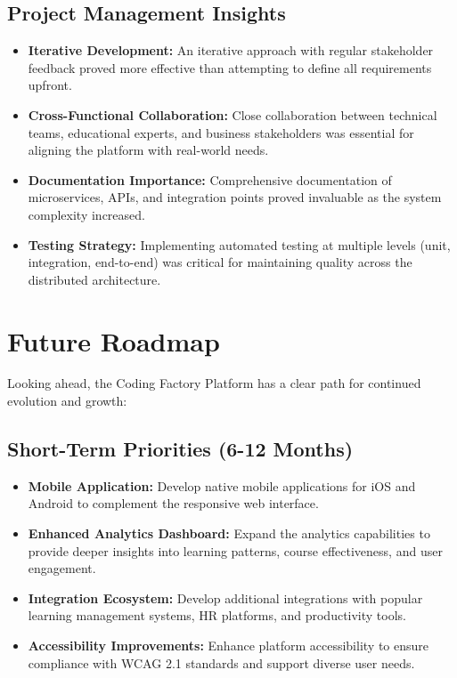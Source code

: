 \documentclass[12pt,a4paper]{report}
\begin{document}
\subsection{Project Management Insights}

\begin{itemize}
    \item \textbf{Iterative Development:} An iterative approach with regular stakeholder feedback proved more effective than attempting to define all requirements upfront.

    \item \textbf{Cross-Functional Collaboration:} Close collaboration between technical teams, educational experts, and business stakeholders was essential for aligning the platform with real-world needs.

    \item \textbf{Documentation Importance:} Comprehensive documentation of microservices, APIs, and integration points proved invaluable as the system complexity increased.

    \item \textbf{Testing Strategy:} Implementing automated testing at multiple levels (unit, integration, end-to-end) was critical for maintaining quality across the distributed architecture.
\end{itemize}

\section{Future Roadmap}

Looking ahead, the Coding Factory Platform has a clear path for continued evolution and growth:

\subsection{Short-Term Priorities (6-12 Months)}

\begin{itemize}
    \item \textbf{Mobile Application:} Develop native mobile applications for iOS and Android to complement the responsive web interface.

    \item \textbf{Enhanced Analytics Dashboard:} Expand the analytics capabilities to provide deeper insights into learning patterns, course effectiveness, and user engagement.

    \item \textbf{Integration Ecosystem:} Develop additional integrations with popular learning management systems, HR platforms, and productivity tools.

    \item \textbf{Accessibility Improvements:} Enhance platform accessibility to ensure compliance with WCAG 2.1 standards and support diverse user needs.
\end{itemize}
\end{document}
